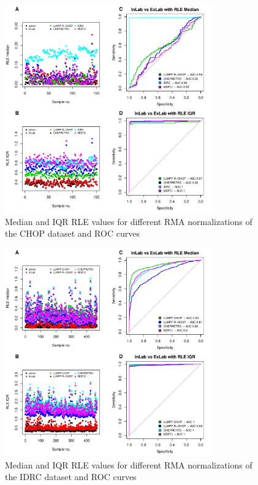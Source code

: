 \documentclass{article}
\begin{document}
\begin{figure}
	\begin{center}
		\includegraphics[width=0.8\textwidth]{figures/CHOP_rle.pdf}
	\end{center}
	\caption{Median and IQR RLE values for different RMA normalizations of the CHOP dataset and ROC curves}
	\label{fig:chop_rle}
\end{figure}

\begin{figure}
	\begin{center}
		\includegraphics[width=0.8\textwidth]{figures/IDRC_rle.pdf}
	\end{center}
	\caption{Median and IQR RLE values for different RMA normalizations of the IDRC dataset and ROC curves}
	\label{fig:idrc_rle}
\end{figure}
\end{document}
